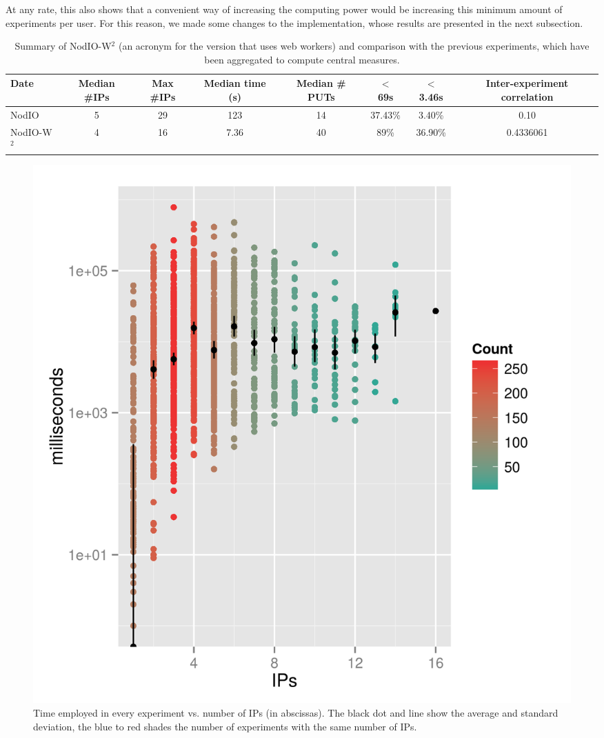 \documentclass{sig-alternate}
\begin{document}
At any rate, this also shows that a convenient way of increasing the
computing power would be increasing this minimum amount of experiments
per user. For this reason, we made some changes to the implementation,
whose results are presented in the next subsection. %

\begin{table}[!htb]
\caption{Summary of {\sf NodIO-W$^2$} (an acronym for the version that
  uses web workers) and comparison with the previous
  experiments, which have been aggregated to compute central measures. \label{tab:summary:ww}}
\begin{center}
\begin{tabular}{l|ccccccc}
\hline
Date & Median \#IPs & Max \#IPs & Median time (s) & Median \# PUTs & $<$ 69s & $<$ 3.46s & Inter-experiment correlation\\
\hline
{\sf NodIO} & 5 & 29 & 123 & 14 & 37.43\% & 3.40\% & 0.10 \\
{\sf NodIO-W$^2$} & 4  & 16 & 7.36 & 40 & 89\% & 36.90\% & 0.4336061 \\
\hline
\end{tabular}
\end{center}
\end{table}
%
\begin{figure}[!htb]
\centering
\includegraphics[width=0.9\linewidth]{ips-time-ww.png}
\caption{Time employed in every experiment vs. number of IPs (in
  abscissas). The black dot and line show the average and standard
  deviation, the blue to red shades the number of experiments with the same
  number of IPs. } 
\label{fig:ipstime:w2}
\end{figure}
\end{document}
